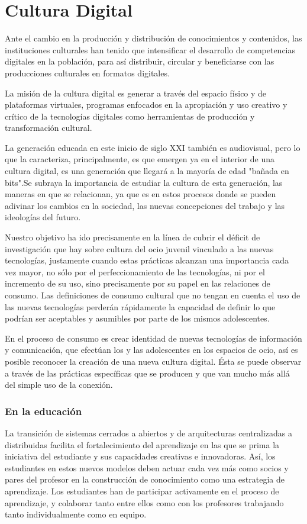 \documentclass{article}
\begin{document}
\section{Cultura Digital}
Ante el cambio en la producción y distribución de conocimientos y contenidos, las instituciones culturales han tenido que intensificar el desarrollo de competencias digitales en la población, para así distribuir, circular y beneficiarse con las producciones culturales en formatos digitales.

La misión de la cultura digital es generar a través del espacio físico y de plataformas virtuales, programas enfocados en la apropiación y uso creativo y crítico de la tecnologías digitales como herramientas de producción y transformación cultural.

La generación educada en este inicio de siglo XXI
también es audiovisual, pero lo que la caracteriza, principalmente, es que emergen ya en el
interior de una cultura digital, es una generación que llegará a la mayoría de edad "bañada en bits".Se subraya la importancia de estudiar la cultura de esta generación, las maneras en que se relacionan, ya que es en estos procesos donde se pueden adivinar los cambios en la sociedad, las nuevas concepciones del trabajo y las ideologías del futuro.

Nuestro objetivo ha ido precisamente en la línea de cubrir el déficit de investigación que hay
sobre cultura del ocio juvenil vinculado a las nuevas tecnologías, justamente cuando estas
prácticas alcanzan una importancia cada vez mayor, no sólo por el perfeccionamiento de las
tecnologías, ni por el incremento de su uso, sino precisamente por su papel en las relaciones
de consumo. Las definiciones de consumo cultural que no tengan en cuenta el uso de las
nuevas tecnologías perderán rápidamente la capacidad de definir lo que podrían
ser aceptables y asumibles por parte de los mismos adolescentes. 

En el proceso de consumo es crear identidad de nuevas tecnologías de información y comunicación, que efectúan los y las adolescentes en los espacios de ocio, así es posible reconocer la creación de una nueva cultura digital. Ésta se puede observar a través de las prácticas específicas que se producen y que van mucho más allá del simple uso de la conexión.

\subsubsection{En la educación}
 La transición de sistemas cerrados a abiertos y de arquitecturas centralizadas a
 distribuidas facilita el fortalecimiento del aprendizaje en las que se prima la iniciativa del estudiante y sus capacidades
 creativas e innovadoras. Así, los estudiantes en estos nuevos modelos deben actuar cada vez más como socios y pares del profesor en la construcción de conocimiento como una estrategia de aprendizaje. Los estudiantes han de participar activamente en el proceso de aprendizaje, y colaborar tanto entre ellos como con los profesores trabajando tanto individualmente como en equipo. 
 
\end{document}
